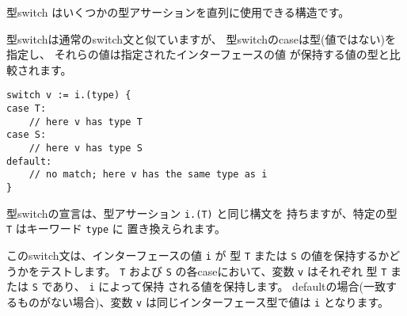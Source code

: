 型switch はいくつかの型アサーションを直列に使用できる構造です。

型switchは通常のswitch文と似ていますが、
型switchのcaseは型(値ではない)を指定し、
それらの値は指定されたインターフェースの値
が保持する値の型と比較されます。

\begin{lstlisting}[numbers=none]
switch v := i.(type) {
case T:
    // here v has type T
case S:
    // here v has type S
default:
    // no match; here v has the same type as i
}
\end{lstlisting}

型switchの宣言は、型アサーション \texttt{i.(T)} と同じ構文を
持ちますが、特定の型 \texttt{T} はキーワード \texttt{type} に
置き換えられます。

このswitch文は、インターフェースの値 \texttt{i} が 型 \texttt{T} 
または \texttt{S} の値を保持するかどうかをテストします。 \texttt{T}
および \texttt{S} の各caseにおいて、変数 \texttt{v} はそれぞれ 
型 \texttt{T} または \texttt{S} であり、 \texttt{i} によって保持
される値を保持します。 defaultの場合(一致するものがない場合)、変数 \texttt{v}
は同じインターフェース型で値は \texttt{i} となります。